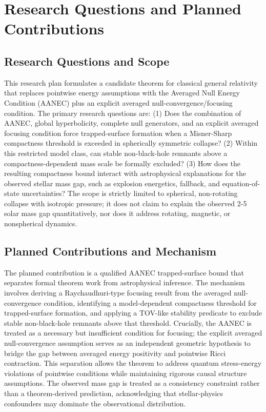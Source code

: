\documentclass[conference]{IEEEtran}
\begin{document}
\section{Research Questions and Planned Contributions}
\subsection{Research Questions and Scope}
This research plan formulates a candidate theorem for classical general relativity that replaces pointwise energy assumptions with the Averaged Null Energy Condition (AANEC) plus an explicit averaged null-convergence/focusing condition. The primary research questions are: (1) Does the combination of AANEC, global hyperbolicity, complete null generators, and an explicit averaged focusing condition force trapped-surface formation when a Misner-Sharp compactness threshold is exceeded in spherically symmetric collapse? (2) Within this restricted model class, can stable non-black-hole remnants above a compactness-dependent mass scale be formally excluded? (3) How does the resulting compactness bound interact with astrophysical explanations for the observed stellar mass gap, such as explosion energetics, fallback, and equation-of-state uncertainties? The scope is strictly limited to spherical, non-rotating collapse with isotropic pressure; it does not claim to explain the observed 2-5 solar mass gap quantitatively, nor does it address rotating, magnetic, or nonspherical dynamics.~\cite{cite_0ed84243cf171bc4}

\subsection{Planned Contributions and Mechanism}
The planned contribution is a qualified AANEC trapped-surface bound that separates formal theorem work from astrophysical inference. The mechanism involves deriving a Raychaudhuri-type focusing result from the averaged null-convergence condition, identifying a model-dependent compactness threshold for trapped-surface formation, and applying a TOV-like stability predicate to exclude stable non-black-hole remnants above that threshold. Crucially, the AANEC is treated as a necessary but insufficient condition for focusing; the explicit averaged null-convergence assumption serves as an independent geometric hypothesis to bridge the gap between averaged energy positivity and pointwise Ricci contraction. This separation allows the theorem to address quantum stress-energy violations of pointwise conditions while maintaining rigorous causal structure assumptions. The observed mass gap is treated as a consistency constraint rather than a theorem-derived prediction, acknowledging that stellar-physics confounders may dominate the observational distribution.~\cite{cite_7a407c865faafd11,cite_7a44e6730c44cb39,cite_c369df652181e8f7}
\end{document}
